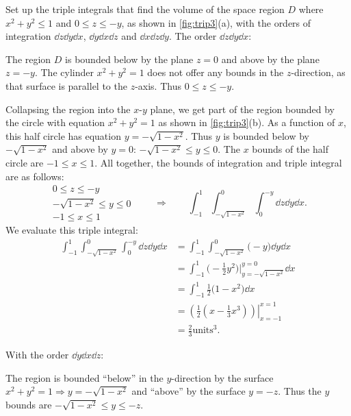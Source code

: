 \begin{example}\label{ex_trip3}
Set up the triple integrals that find the volume of the space region $D$ where $x^2+y^2\le1$ and $0\le z\le-y$, as shown in \autoref{fig:trip3}(a), with the orders of integration $\dd z\dd y\dd x$, $\dd y\dd x\dd z$ and $\dd x\dd z\dd y$.
\solution
The order $\dd z\dd y\dd x$:\bigskip

The region $D$ is bounded below by the plane $z=0$ and above by the plane $z=-y$. The cylinder $x^2+y^2=1$ does not offer any bounds in the $z$-direction, as that surface is parallel to the $z$-axis. Thus $0\leq z\leq -y$.

Collapsing the region into the $x$-$y$ plane, we get part of the region bounded by the circle with equation $x^2+y^2=1$ as shown in \autoref{fig:trip3}(b). As a function of $x$, this half circle has equation $y=-\sqrt{1-x^2}$. Thus $y$ is bounded below by $-\sqrt{1-x^2}$ and above by $y=0$: $-\sqrt{1-x^2}\leq y\leq 0$. The $x$ bounds of the half circle are $-1\leq x\leq 1$. All together, the bounds of integration and triple integral are  as follows:
\[
 \begin{gathered}
  0\leq z\leq -y\\
  -\sqrt{1-x^2}\leq y\leq 0\\
  -1\leq x\leq 1
 \end{gathered}
 \qquad\Rightarrow\qquad
 \int_{-1}^1\int_{-\sqrt{1-x^2}}^{0}\int_0^{-y}\dd z\dd y\dd x.
\]
We evaluate this triple integral:
\begin{align*}
	\int_{-1}^1\int_{-\sqrt{1-x^2}}^{0}\int_0^{-y}\dd z\dd y\dd x
	&= \int_{-1}^1\int_{-\sqrt{1-x^2}}^{0}\bigl(-y\bigr)\dd y\dd x\\
	&=\int_{-1}^1\bigl(-\frac12y^2\bigr)\Big|_{y=-\sqrt{1-x^2}}^{y=0}\dd x\\
	&= \int_{-1}^1 \frac12\bigl(1-x^2\bigr)\dd x\\
	&= \left.\left(\frac12\left(x-\frac13x^3\right)\right)\right|_{x=-1}^{x=1}\\
	&= \frac23\text{units}^3.
\end{align*}

\noindent With the order $\dd y\dd x\dd z$:\bigskip

The region is bounded ``below'' in the $y$-direction by the surface $x^2+y^2=1 \Rightarrow y=-\sqrt{1-x^2}$ and ``above'' by the surface $y=-z$. Thus the $y$ bounds are $-\sqrt{1-x^2}\leq y\leq -z$.


\end{example}
